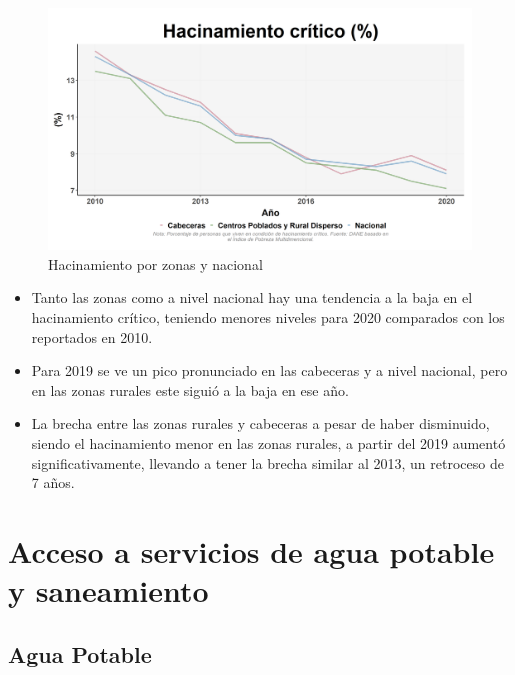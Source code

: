     \begin{figure}[H]
        \caption{Hacinamiento por zonas y nacional \label{map_result_2} }
        \begin{center}
        \includegraphics[width=\textwidth,keepaspectratio]{img/var_267_trend.png}
        \end{center}
    \end{figure}
            \begin{itemize}
                    \item Tanto las zonas como a nivel nacional hay una tendencia a la baja en el hacinamiento crítico, teniendo menores niveles para 2020 comparados con los reportados en 2010.
                    \item Para 2019 se ve un pico pronunciado en las cabeceras y a nivel nacional, pero en las zonas rurales este siguió a la baja en ese año.
                    \item La brecha entre las zonas rurales y cabeceras a pesar de haber disminuido, siendo el hacinamiento menor en las zonas rurales, a partir del 2019 aumentó significativamente, llevando a tener la brecha similar al 2013, un retroceso de 7 años.
                    \end{itemize}

\section{Acceso a servicios de agua potable y saneamiento}
    \subsection{Agua Potable}

